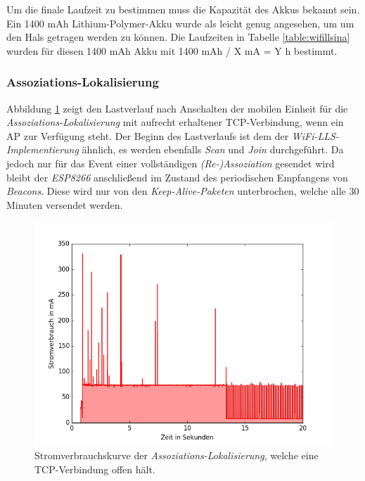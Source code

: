 Um die finale Laufzeit zu bestimmen muss die Kapazität des Akkus bekannt sein.
Ein 1400 mAh Lithium-Polymer-Akku wurde als leicht genug angesehen, um um den Hals getragen werden zu können.
Die Laufzeiten in Tabelle \ref{table:wifillsina} wurden für diesen 1400 mAh Akku mit 1400 mAh / X mA = Y h bestimmt.



\subsubsection{Assoziations-Lokalisierung}
\label{ch:phase1:sec:powerindirekt}
Abbildung \ref{fig:tcphold} zeigt den Lastverlauf nach Anschalten der mobilen Einheit für die \emph{Assoziations-Lokalisierung} mit aufrecht erhaltener TCP-Verbindung, wenn ein AP zur Verfügung steht. 
Der Beginn des Lastverlaufs ist dem der \emph{WiFi-LLS-Implementierung} ähnlich, es werden ebenfalls \emph{Scan} und \emph{Join} durchgeführt.
Da jedoch nur für das Event einer vollständigen \emph{(Re-)Assoziation} gesendet wird bleibt der \emph{ESP8266} anschließend im Zustand des periodischen Empfangens von \emph{Beacons}.
Diese wird nur von den \emph{Keep-Alive-Paketen} unterbrochen, welche alle 30 Minuten versendet werden.\\

\begin{figure}[h!]
  \centering
	\includegraphics[width=\textwidth]{plots/tcphold.png}
  \caption{Stromverbrauchskurve der \emph{Assoziations-Lokalisierung}, welche eine TCP-Verbindung offen hält.}
  \label{fig:tcphold}
\end{figure}

